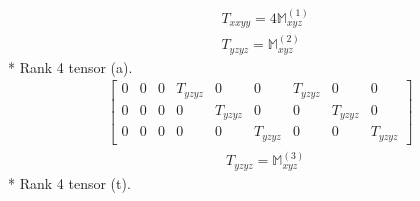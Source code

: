 \documentclass[fleqn,8pt,landscape]{jsarticle}
\begin{document}
\begin{align*}
& T_{xxyy} = 4 \mathbb{M}_{xyz}^{(1)} \\
& T_{yzyz} = \mathbb{M}_{xyz}^{(2)}
\end{align*}
* Rank 4 tensor (a).
\begin{align*}
\begin{bmatrix} 0 & 0 & 0 & T_{yzyz} & 0 & 0 & T_{yzyz} & 0 & 0 \\ 0 & 0 & 0 & 0 & T_{yzyz} & 0 & 0 & T_{yzyz} & 0 \\ 0 & 0 & 0 & 0 & 0 & T_{yzyz} & 0 & 0 & T_{yzyz} \end{bmatrix}
\end{align*}
\begin{align*}
& T_{yzyz} = \mathbb{M}_{xyz}^{(3)}
\end{align*}
* Rank 4 tensor (t).
\end{document}
